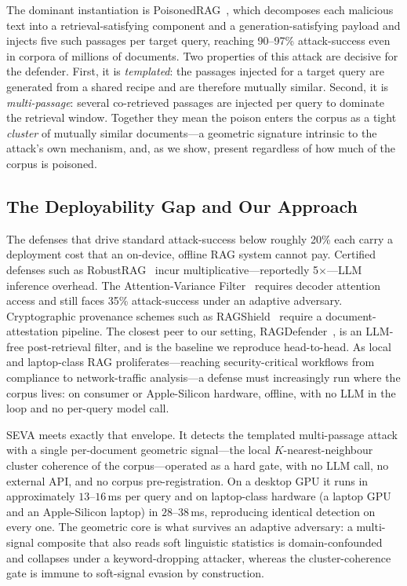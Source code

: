 \documentclass[10pt,journal,compsoc]{IEEEtran}
\begin{document}
The dominant instantiation is PoisonedRAG~\cite{poisonedrag}, which decomposes
each malicious text into a retrieval-satisfying component and a
generation-satisfying payload and injects five such passages per target
query, reaching 90--97\% attack-success even in corpora of millions of
documents. Two properties of this attack are decisive for the defender. First,
it is \emph{templated}: the passages injected for a target query are generated
from a shared recipe and are therefore mutually similar. Second, it is
\emph{multi-passage}: several co-retrieved passages are injected per query to
dominate the retrieval window. Together they mean the poison enters the corpus
as a tight \emph{cluster} of mutually similar documents---a geometric signature
intrinsic to the attack's own mechanism, and, as we show, present regardless of
how much of the corpus is poisoned.

\subsection{The Deployability Gap and Our Approach}
The defenses that drive standard attack-success below roughly 20\% each carry a
deployment cost that an on-device, offline RAG system cannot pay. Certified
defenses such as RobustRAG~\cite{robustrag} incur multiplicative---reportedly
5$\times$---LLM inference overhead. The Attention-Variance Filter~\cite{avfilter}
requires decoder attention access and still faces 35\% attack-success under an
adaptive adversary. Cryptographic provenance schemes such as
RAGShield~\cite{ragshield} require a document-attestation pipeline. The
closest peer to our setting, RAGDefender~\cite{ragdefender}, is an LLM-free
post-retrieval filter, and is the baseline we reproduce head-to-head. As local
and laptop-class RAG proliferates---reaching security-critical workflows from
compliance to network-traffic analysis---a defense must increasingly
run where the corpus lives: on consumer or Apple-Silicon hardware, offline, with no
LLM in the loop and no per-query model call.

SEVA meets exactly that envelope. It detects the templated multi-passage attack
with a single per-document geometric signal---the local $K$-nearest-neighbour
cluster coherence of the corpus---operated as a hard gate, with no LLM call, no
external API, and no corpus pre-registration. On a desktop GPU it runs
in approximately $13$--$16$\,ms per query and on laptop-class hardware (a laptop GPU
and an Apple-Silicon laptop) in $28$--$38$\,ms, reproducing identical detection on
every one.
The geometric core is what survives an adaptive adversary: a multi-signal
composite that also reads soft linguistic statistics is domain-confounded and
collapses under a keyword-dropping attacker, whereas the cluster-coherence gate
is immune to soft-signal evasion by construction.
\end{document}
